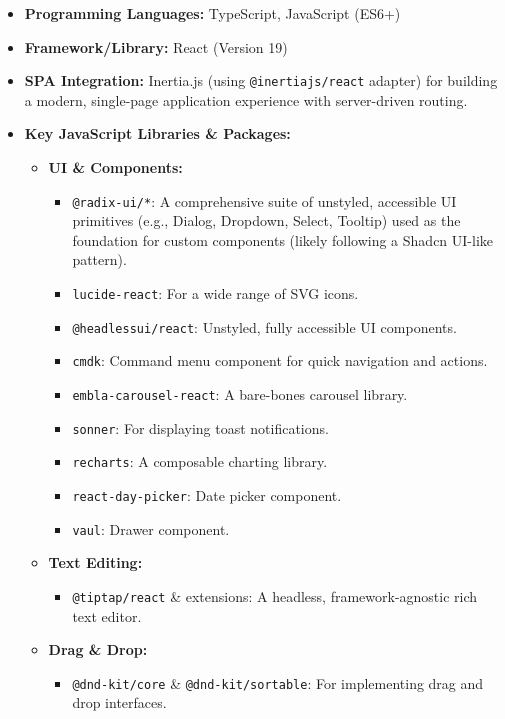 \begin{itemize}
    \item \textbf{Programming Languages:} TypeScript, JavaScript (ES6+)
    \item \textbf{Framework/Library:} React (Version 19)
    \item \textbf{SPA Integration:} Inertia.js (using \texttt{@inertiajs/react} adapter) for building a modern, single-page application experience with server-driven routing.
    \item \textbf{Key JavaScript Libraries \& Packages:}
    \begin{itemize}
        \item \textbf{UI \& Components:}
        \begin{itemize}
            \item \texttt{@radix-ui/*}: A comprehensive suite of unstyled, accessible UI primitives (e.g., Dialog, Dropdown, Select, Tooltip) used as the foundation for custom components (likely following a Shadcn UI-like pattern).
            \item \texttt{lucide-react}: For a wide range of SVG icons.
            \item \texttt{@headlessui/react}: Unstyled, fully accessible UI components.
            \item \texttt{cmdk}: Command menu component for quick navigation and actions.
            \item \texttt{embla-carousel-react}: A bare-bones carousel library.
            \item \texttt{sonner}: For displaying toast notifications.
            \item \texttt{recharts}: A composable charting library.
            \item \texttt{react-day-picker}: Date picker component.
            \item \texttt{vaul}: Drawer component.
        \end{itemize}
        \item \textbf{Text Editing:}
        \begin{itemize}
            \item \texttt{@tiptap/react} \& extensions: A headless, framework-agnostic rich text editor.
        \end{itemize}
        \item \textbf{Drag \& Drop:}
        \begin{itemize}
            \item \texttt{@dnd-kit/core} \& \texttt{@dnd-kit/sortable}: For implementing drag and drop interfaces.

\end{itemize}
\end{itemize}
\end{itemize}
